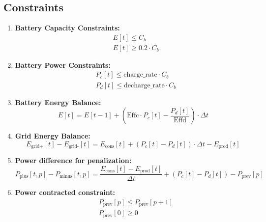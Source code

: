\documentclass{article}
\begin{document}
\subsection*{Constraints}
\begin{enumerate}
    \item \textbf{Battery Capacity Constraints:}
    \[
    \begin{aligned}
        & E[t] \leq C_b \\
        & E[t] \geq 0.2 \cdot C_b
    \end{aligned}
    \]

    \item \textbf{Battery Power Constraints:}
    \[
    \begin{aligned}
        & P_c[t] \leq \text{charge\_rate} \cdot C_b \\
        & P_d[t] \leq \text{decharge\_rate} \cdot C_b
    \end{aligned}
    \]

    \item \textbf{Battery Energy Balance:}
    \[
    E[t] = E[t-1] + (\text{Effc} \cdot P_c[t] - \frac{P_d[t]}{\text{Effd}}) \cdot \Delta t
    \]

    \item \textbf{Grid Energy Balance:}
    \[
    E_{\text{grid+}}[t] - E_{\text{grid-}}[t] = E_{\text{cons}}[t] + (P_c[t] - P_d[t]) \cdot \Delta t - E_{\text{prod}}[t]
    \]

    \item \textbf{Power difference for penalization:}
    \[
    P_{\text{plus}}[t, p] - P_{\text{minus}}[t, p] = \frac{E_{\text{cons}}[t] - E_{\text{prod}}[t]}{\Delta t} + (P_c[t] - P_d[t]) - P_{\text{prev}}[p]
    \]

    \item \textbf{Power contracted constraint:}
    \[
    \begin{aligned}
        & P_{\text{prev}}[p] \leq P_{\text{prev}}[p+1] \\
        & P_{\text{prev}}[0] \geq 0
    \end{aligned}
    \]
\end{enumerate}
\end{document}
